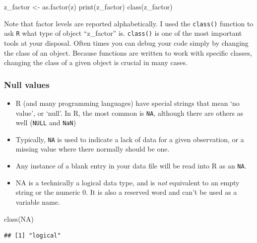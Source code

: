 \documentclass[
]{book}
\newenvironment{Shaded}{\begin{snugshade}}{\end{snugshade}}
\newcommand{\ConstantTok}[1]{\textcolor[rgb]{0.00,0.00,0.00}{#1}}
\newcommand{\FunctionTok}[1]{\textcolor[rgb]{0.00,0.00,0.00}{#1}}
\newcommand{\NormalTok}[1]{#1}
\newcommand{\OtherTok}[1]{\textcolor[rgb]{0.56,0.35,0.01}{#1}}
\begin{document}
\begin{Shaded}
\begin{Highlighting}[]
\NormalTok{z\_factor }\OtherTok{\textless{}{-}} \FunctionTok{as.factor}\NormalTok{(z)}
\FunctionTok{print}\NormalTok{(z\_factor)}
\FunctionTok{class}\NormalTok{(z\_factor)}
\end{Highlighting}
\end{Shaded}

Note that factor levels are reported alphabetically. I used the \texttt{class()} function to ask \texttt{R} what type of object ``z\_factor'' is. \texttt{class()} is one of the most important tools at your disposal. Often times you can debug your code simply by changing the class of an object. Because functions are written to work with specific classes, changing the class of a given object is crucial in many cases.

\hypertarget{null-values}{%
\subsubsection{Null values}\label{null-values}}

\begin{itemize}
\item
  R (and many programming languages) have special strings that mean `no value', or `null'. In R, the most common is \texttt{NA}, although there are others as well (\texttt{NULL} and \texttt{NaN})
\item
  Typically, \texttt{NA} is used to indicate a lack of data for a given observation, or a missing value where there normally should be one.
\item
  Any instance of a blank entry in your data file will be read into R as an \texttt{NA}.
\item
  NA is a technically a logical data type, and is \emph{not} equivalent to an empty string or the numeric 0. It is also a reserved word and can't be used as a variable name.
\end{itemize}

\begin{Shaded}
\begin{Highlighting}[]
\FunctionTok{class}\NormalTok{(}\ConstantTok{NA}\NormalTok{)}
\end{Highlighting}
\end{Shaded}

\begin{verbatim}
## [1] "logical"
\end{verbatim}
\end{document}
